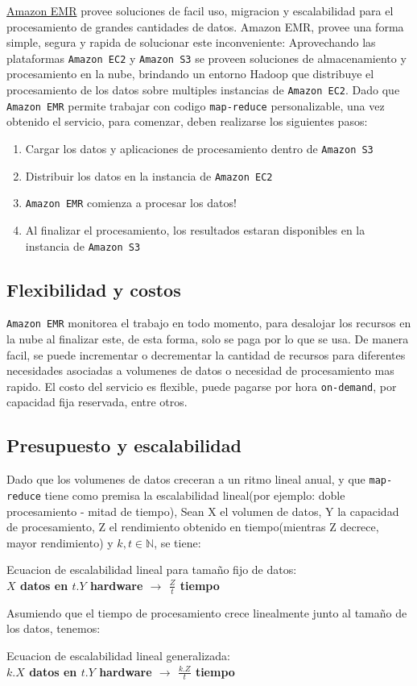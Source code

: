 \documentclass{article}
\begin{document}
\href{http://aws.amazon.com/es/elasticmapreduce/}{Amazon EMR} provee soluciones de facil uso, migracion y escalabilidad para el procesamiento de grandes cantidades de 
datos.
Amazon EMR, provee una forma simple, segura y rapida de solucionar este inconveniente: Aprovechando las plataformas \verb|Amazon EC2| y \verb|Amazon S3| se proveen soluciones de almacenamiento y procesamiento en la nube, brindando un entorno Hadoop que distribuye el procesamiento de los datos sobre multiples instancias de \verb|Amazon EC2|. Dado que \verb|Amazon EMR| permite trabajar con codigo \verb|map-reduce| personalizable, una vez obtenido el servicio, para comenzar, deben realizarse los siguientes pasos:
\begin{enumerate}
  \item Cargar los datos y aplicaciones de procesamiento dentro de \verb|Amazon S3|
  \item Distribuir los datos en la instancia de \verb|Amazon EC2|
  \item \verb|Amazon EMR| comienza a procesar los datos!
  \item Al finalizar el procesamiento, los resultados estaran disponibles en la instancia de \verb|Amazon S3|
\end{enumerate}

\subsection{Flexibilidad y costos}
\verb|Amazon EMR| monitorea el trabajo en todo momento, para desalojar los recursos en la nube al finalizar este, de esta forma, solo se paga por lo que se usa.
De manera facil, se puede incrementar o decrementar la cantidad de recursos para diferentes necesidades asociadas a volumenes de datos o necesidad de procesamiento mas rapido. El costo del servicio es flexible, puede pagarse por hora \verb|on-demand|, por capacidad fija reservada, entre otros. 

\subsection{Presupuesto y escalabilidad}
Dado que los volumenes de datos creceran a un ritmo lineal anual, y que \verb|map-reduce| tiene como premisa la escalabilidad lineal(por ejemplo: doble procesamiento - mitad de tiempo), Sean X el volumen de datos, Y la capacidad de procesamiento, Z el rendimiento obtenido en tiempo(mientras Z decrece, mayor rendimiento) y $k,t \in \mathbb{N}$, se tiene:
\newpage
\begin{center}
    Ecuacion de escalabilidad lineal para tamaño fijo de datos: \\
    \textbf{$X$ datos en $t.Y$ hardware $\rightarrow$ $\frac{Z}{t}$ tiempo}
\end{center}
Asumiendo que el tiempo de procesamiento crece linealmente junto al tamaño de los datos, tenemos:\\
\begin{center}
    Ecuacion de escalabilidad lineal generalizada:\\
    \textbf{$k.X$ datos en $t.Y$ hardware $\rightarrow$ $\frac{k.Z}{t}$ tiempo}
\end{center}
\end{document}
